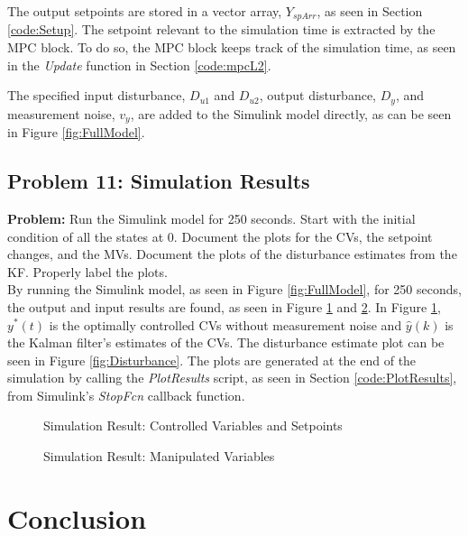 \documentclass[12pt]{article}
\begin{document}
The output setpoints are stored in a vector array, $Y_{spArr}$, as seen in Section \ref{code:Setup}. The setpoint relevant to the simulation time is extracted by the MPC block. To do so, the MPC block keeps track of the simulation time, as seen in the \textit{Update} function in Section \ref{code:mpcL2}.

The specified input disturbance, $D_{u1}$ and $D_{u2}$, output disturbance, $D_y$, and measurement noise, $v_y$, are added to the Simulink model directly, as can be seen in Figure \ref{fig:FullModel}.

\subsection{Problem 11: Simulation Results}
\label{sec:Results}

\textbf{Problem:} Run the Simulink model for 250 seconds. Start with the initial condition of all the states at 0. Document the plots for the CVs, the setpoint changes, and the MVs. Document the plots of the disturbance estimates from the KF. Properly label the plots. \\

By running the Simulink model, as seen in Figure \ref{fig:FullModel}, for 250 seconds, the output and input results are found, as seen in Figure \ref{fig:Outputs} and \ref{fig:Inputs}. In Figure \ref{fig:Outputs}, $y^*(t)$ is the optimally controlled CVs without measurement noise and $\hat{y}(k)$ is the Kalman filter's estimates of the CVs. The disturbance estimate plot can be seen in Figure \ref{fig:Disturbance}. The plots are generated at the end of the simulation by calling the \textit{PlotResults} script, as seen in Section \ref{code:PlotResults}, from Simulink's \textit{StopFcn} callback function.

\begin{figure}[h!]
	
	\centering
	\caption{Simulation Result: Controlled Variables and Setpoints}
	\label{fig:Outputs}
\end{figure}

\begin{figure}[h!]
	
	\centering
	\caption{Simulation Result: Manipulated Variables}
	\label{fig:Inputs}
\end{figure}

\section{Conclusion}
\end{document}
